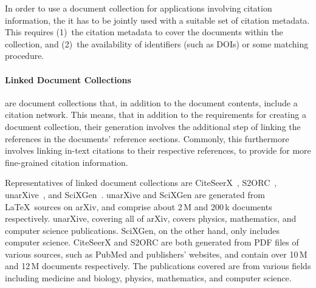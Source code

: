In order to use a document collection for applications involving citation information, the it has to be jointly used with a suitable set of citation metadata. This requires (1)~the citation metadata to cover the documents within the collection, and (2)~the availability of identifiers (such as DOIs) or some matching procedure.  %

\paragraph{Linked Document Collections}
are document collections that, in addition to the document contents, include a citation network. This means, that in addition to the requirements for creating a document collection, their generation involves the additional step of linking the references in the documents' reference sections. Commonly, this furthermore involves linking in-text citations to their respective references, to provide for more fine-grained citation information.

Representatives of linked document collections are CiteSeerX~\cite{Wu2015,Wu2016,Patel2021}, %
S2ORC~\cite{Lo2020}, unarXive~\cite{Saier2020}, and SciXGen~\cite{chen2021-scixgen}.
unarXive and SciXGen are generated from \LaTeX\ sources on arXiv, and comprise about 2\,M and 200\,k documents respectively. unarXive, covering all of arXiv, covers physics, mathematics, and computer science publications. SciXGen, on the other hand, only includes computer science. CiteSeerX and S2ORC are both generated from PDF files of various sources, such as PubMed and publishers' websites, and contain over 10\,M and 12\,M documents respectively. The publications covered are from various fields including medicine and biology, physics, mathematics, and computer science.



